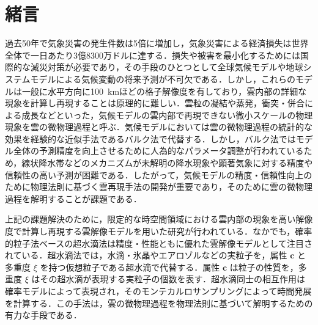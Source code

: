 \section{緒言}
過去50年で気象災害の発生件数は5倍に増加し，気象災害による経済損失は世界全体で一日あたり3億8300万ドルに達する\cite{wmo2021}．損失や被害を最小化するためには国際的な減災対策が必要であり，その手段のひとつとして全球気候モデル\cite{climatemodel}や地球システムモデル\cite{earthsystem}による気候変動の将来予測が不可欠である．しかし，これらのモデルは一般に水平方向に\SI{100}{\km}ほどの格子解像度を有しており，雲内部の詳細な現象を計算し再現することは原理的に難しい\cite{grabowski2019}．雲粒の凝結や蒸発，衝突・併合による成長などといった，気候モデルの雲内部で再現できない微小スケールの物理現象を雲の微物理過程と呼ぶ．気候モデルにおいては雲の微物理過程の統計的な効果を経験的な近似手法であるバルク法で代替する\cite{kessler1969,lin1983,rutledge1984}．しかし，バルク法ではモデル全体の予測精度を向上させるために人為的なパラメータ調整が行われている\cite{hourdin2017}ため，線状降水帯などのメカニズムが未解明の降水現象や顕著気象に対する精度や信頼性の高い予測が困難である．したがって，気候モデルの精度・信頼性向上のために物理法則に基づく雲再現手法の開発が重要であり，そのために雲の微物理過程を解明することが課題である．

上記の課題解決のために，限定的な時空間領域における雲内部の現象を高い解像度で計算し再現する雲解像モデルを用いた研究が行われている\cite{khain2015,grabowski2019,morrison2020}．なかでも，確率的粒子法ベースの超水滴法\cite{shima2009,shima2020}は精度・性能ともに優れた雲解像モデルとして注目されている．超水滴法では，水滴・氷晶やエアロゾルなどの実粒子を，属性 $\bm{c}$ と多重度 $\xi$ を持つ仮想粒子である超水滴で代替する．属性 $\bm{c}$ は粒子の性質を，多重度 $\xi$ はその超水滴が表現する実粒子の個数を表す．超水滴同士の相互作用は確率モデルによって表現され，そのモンテカルロサンプリングによって時間発展を計算する．この手法は，雲の微物理過程を物理法則に基づいて解明するための有力な手段である．

